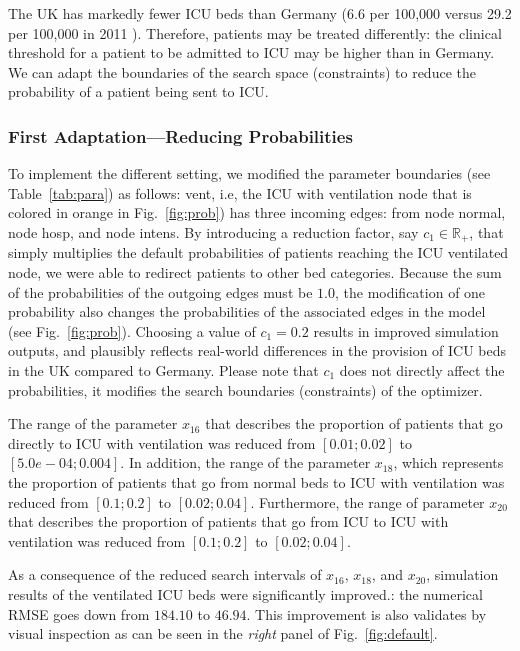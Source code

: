 \documentclass[conference]{IEEEtran}
\def\figref#1{Fig.~\ref{#1}}
\begin{document}
The UK has markedly fewer ICU beds than Germany (6.6 per 100,000 versus 29.2 per 100,000 in 2011  \cite{rhodes_variability_2012}).
Therefore, patients may be treated differently: the clinical threshold for a patient to be admitted to ICU may be higher than in Germany. We can adapt the boundaries of the search space (constraints) to reduce the probability of a patient being sent to \gls{ICU}.

\subsubsection{First Adaptation---Reducing Probabilities}
To implement the different setting, we modified the parameter boundaries (see Table~\ref{tab:para}) as follows: vent, i.e, the \gls{ICU} with ventilation node that is colored in orange in \figref{fig:prob}) has three incoming edges: from node normal, node hosp, and node intens.
By introducing a reduction factor, say  $c_1 \in \mathbb{R_+}$, that simply multiplies the default probabilities of patients reaching the ICU ventilated node, we were able to redirect patients to other bed categories. Because the sum  of the probabilities of the outgoing edges must be $1.0$, the modification of one probability also changes the probabilities of the associated edges in the model (see \figref{fig:prob}).
Choosing a value of $c_1=0.2$ results in improved simulation outputs, and plausibly reflects real-world differences in the provision of ICU beds in the UK compared to Germany. Please note that $c_1$ does not directly affect the probabilities, it modifies the search boundaries (constraints) of the optimizer.

The range of the parameter 
$x_{16}$ that describes the proportion of patients that go directly to ICU with ventilation 
was reduced from $[0.01; 0.02]$ to $[5.0e-04; 0.004]$. In addition, the range of the parameter $x_{18}$, which represents the proportion of patients that go from normal beds to ICU with ventilation was reduced from $[0.1; 0.2]$ to $[0.02; 0.04]$. Furthermore, 
the range of parameter $x_{20}$ that describes the proportion of patients that go from ICU to ICU with ventilation was reduced from $[0.1; 0.2]$ to $[0.02; 0.04]$. 

As a consequence of the reduced search intervals of $x_{16}$, $x_{18}$, and $x_{20}$, simulation results of the ventilated \gls{ICU} beds were significantly improved.: the numerical \gls{RMSE} goes down from $184.10$ to $46.94$. This improvement is also validates by visual inspection as can be seen in the \emph{right} panel of \figref{fig:default}.
\end{document}

